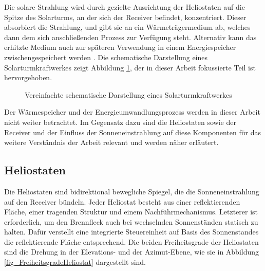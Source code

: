 Die solare Strahlung wird durch gezielte Ausrichtung der Heliostaten auf die Spitze des Solarturms, an der sich der Receiver befindet, konzentriert.
Dieser absorbiert die Strahlung, und gibt sie an ein Wärmeträgermedium ab, welches dann dem sich anschließenden Prozess zur Verfügung steht.
Alternativ kann das erhitzte Medium auch zur späteren Verwendung in einem Energiespeicher zwischengespeichert werden \cite[S.11]{DissBelhomme}.
Die schematische Darstellung eines Solarturmkraftwerkes zeigt Abbildung \ref{fig_SchemaSolarturmkraftwerk}, der in dieser Arbeit fokussierte Teil ist hervorgehoben.

\begin{figure}[h!]
    \centering
\setlength{\fboxsep}{5pt}
    \setlength{\fboxrule}{1pt}
\caption[Vereinfachte schematische Darstellung eines Solarturmkraftwerkes]{Vereinfachte schematische Darstellung eines Solarturmkraftwerkes \cite[S.5]{DissZanger}}
    \label{fig_SchemaSolarturmkraftwerk}
\end{figure}


Der Wärmespeicher und der Energieumwandlungsprozess werden in dieser Arbeit nicht weiter betrachtet.
Im Gegensatz dazu sind die Heliostaten sowie der Receiver und der Einfluss der Sonneneinstrahlung auf diese Komponenten für das weitere Verständnis der Arbeit relevant und werden näher erläutert.


\subsection{Heliostaten} \label{subsec_Heliostaten}
Die Heliostaten sind bidirektional bewegliche Spiegel, die die Sonneneinstrahlung auf den Receiver bündeln.
Jeder Heliostat besteht aus einer reflektierenden Fläche, einer tragenden Struktur und einem Nachführmechanismus.
Letzterer ist erforderlich, um den Brennfleck auch bei wechselnden Sonnenständen statisch zu halten.
Dafür verstellt eine integrierte Steuereinheit auf Basis des Sonnenstandes die reflektierende Fläche entsprechend.
Die beiden Freiheitsgrade der Heliostaten sind die Drehung in der Elevations- und der Azimut-Ebene, wie sie in Abbildung \ref{fig_FreiheitsgradeHeliostat} dargestellt sind. \cite[S.13]{DissBelhomme}

